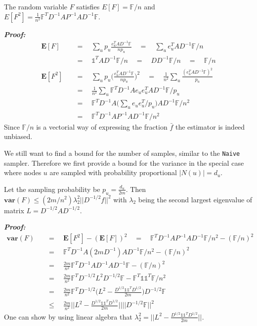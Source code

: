 \begin{lemma}
  The random variable $F$ satisfies $E[F] = \mathds{F}/n$ and \\
  $E[F^2] = \frac{1}{n^2}\mathds{F}^TD^{-1}AP^{-1}AD^{-1}\mathds{F}$.
\end{lemma}
\textbf{\textit{Proof: }}
\begin{align*}
\textbf{E}[F] \quad&=\quad \sum_u p_u \frac{e_u^TAD^{-1}\mathds{F}}{np_u} \quad=\quad \sum_u e_u^TAD^{-1}\mathds{F}/n \\
&=\quad\mathds{1}^TAD^{-1}\mathds{F}/n \quad=\quad DD^{-1}\mathds{F}/n \quad=\quad \mathds{F}/n \\
\textbf{E}[F^2] \quad&=\quad \sum_u p_u \bigg(\frac{e_u^TAD^{-1}\mathds{F}}{np_u}\bigg)^2 \quad=\quad \frac{1}{n^2}\sum_u \frac{(e_u^TAD^{-1}\mathds{F})^2}{p_u} \\
&=\quad\frac{1}{n^2}\sum_u \mathds{F}^TD^{-1}Ae_ue_u^TAD^{-1}\mathds{F}/p_u \\
&=\quad \mathds{F}^TD^{-1}A\bigg(\sum_ue_ue_u^T/p_u\bigg)AD^{-1}\mathds{F}/n^2 \\
&=\quad \mathds{F}^TD^{-1}AP^{-1}AD^{-1}\mathds{F}/n^2
\end{align*}
Since $\mathds{F}/n$ is a vectorial way of expressing the fraction $\bar{f}$ the estimator is indeed unbiased.

We still want to find a bound for the number of samples, similar to the \texttt{Naive} sampler.
Therefore we first provide a bound for the variance in the special case where nodes $u$ are sampled with probability proportional $|N(u)| = d_u$.

\begin{lemma}
  Let the sampling probability be $p_u = \frac{d_u}{2m}$. Then $\textbf{var}(F) \leq (2m/n^2)\lambda_2^2||D^{-1/2}f||^2$ with $\lambda_2$ being the second largest eigenvalue of matrix $L = D^{-1/2}AD^{-1/2}$. 
\end{lemma}
\textbf{\textit{Proof: }}
\begin{align*}
\textbf{var}(F) \quad&=\quad \textbf{E}[F^2] - (\textbf{E}[F])^2 \quad=\quad \mathds{F}^TD^{-1}AP^{-1}AD^{-1}\mathds{F}/n^2 - (\mathds{F}/n)^2 \\
&=\quad \mathds{F}^TD^{-1}A(2mD^{-1})AD^{-1}\mathds{F}/n^2 - (\mathds{F}/n)^2\\
&=\quad \frac{2m}{n^2}\mathds{F}^TD^{-1}AD^{-1}AD^{-1}\mathds{F} - (\mathds{F}/n)^2\\
&=\quad \frac{2m}{n^2}\mathds{F}^TD^{-1/2}L^2D^{-1/2}\mathds{F}-\mathds{F}^T\mathds{1}\mathds{1}^T\mathds{F}/n^2\\
&=\quad \frac{2m}{n^2}\mathds{F}^TD^{-1/2}\bigg(L^2-\frac{D^{1/2}\mathds{1}\mathds{1}^TD^{1/2}}{2m}\bigg)D^{-1/2}\mathds{F}\\
&\leq\quad \frac{2m}{n^2}\bigg|\bigg|L^2 - \frac{D^{1/2}\mathds{1}\mathds{1}^TD^{1/2}}{2m}\bigg|\bigg|||D^{-1/2}\mathds{F}||^2
\end{align*}
One can show by using linear algebra that $\lambda_2^2 = ||L^2 - \frac{D^{1/2}\mathds{1}\mathds{1}^TD^{1/2}}{2m}||$.

